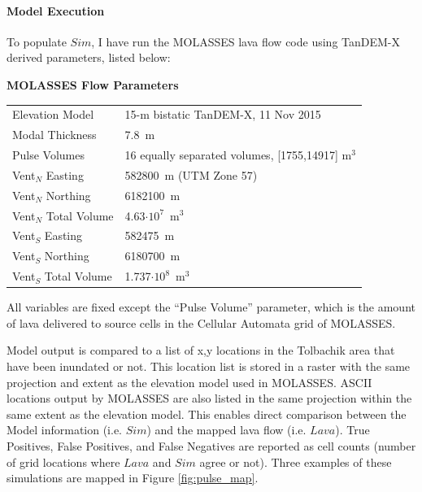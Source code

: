 \documentclass[12pt,letter]{article}
\begin{document}
		\paragraph{Model Execution} To populate $Sim$, I have run the MOLASSES lava flow code using TanDEM-X derived parameters, listed below:
		\begin{center}
			\textbf{MOLASSES Flow Parameters}\\
			\begin{tabular}{l l}
				\toprule
				Elevation Model & 15-m bistatic TanDEM-X, 11 Nov 2015\\
				Modal Thickness & 7.8~m\\
				Pulse Volumes & 16 equally separated volumes, [1755,14917] m$^3$\\
				\midrule
				Vent$_N$ Easting & 582800~m (UTM Zone 57)\\
				Vent$_N$ Northing & 6182100~m\\
				Vent$_N$ Total Volume & 4.63$\cdot10^7$~m$^3$\\
				\midrule
				Vent$_S$ Easting & 582475~m\\
				Vent$_S$ Northing & 6180700~m\\
				Vent$_S$ Total Volume & 1.737$\cdot10^8$~m$^3$\\
				\bottomrule
			\end{tabular}
		\end{center}
		All variables are fixed except the ``Pulse Volume'' parameter, which is the amount of lava delivered to source cells in the Cellular Automata grid of MOLASSES.

		Model output is compared to a list of x,y locations in the Tolbachik area that have been inundated or not. This location list is stored in a raster with the same projection and extent as the elevation model used in MOLASSES. ASCII locations output by MOLASSES are also listed in the same projection within the same extent as the elevation model. This enables direct comparison between the Model information (i.e. $Sim$) and the mapped lava flow (i.e. $Lava$). True Positives, False Positives, and False Negatives are reported as cell counts (number of grid locations where $Lava$ and $Sim$ agree or not). Three examples of these simulations are mapped in Figure \ref{fig:pulse_map}.
\end{document}
